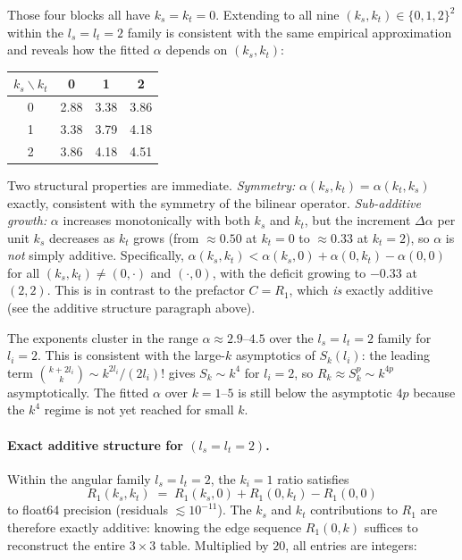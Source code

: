 \documentclass{article}
\begin{document}
Those four blocks all have $k_s=k_t=0$.
Extending to all nine $(k_s,k_t)\in\{0,1,2\}^2$ within the $l_s=l_t=2$ family
is consistent with the same empirical approximation and reveals how the fitted $\alpha$ depends on $(k_s,k_t)$:

\begin{center}
\begin{tabular}{c|ccc}
  $k_s \backslash k_t$ & 0 & 1 & 2 \\
  \hline
  0 & 2.88 & 3.38 & 3.86 \\
  1 & 3.38 & 3.79 & 4.18 \\
  2 & 3.86 & 4.18 & 4.51 \\
\end{tabular}
\end{center}

Two structural properties are immediate.
\emph{Symmetry:} $\alpha(k_s,k_t) = \alpha(k_t,k_s)$ exactly, consistent with
the symmetry of the bilinear operator.
\emph{Sub-additive growth:} $\alpha$ increases monotonically with both $k_s$ and
$k_t$, but the increment $\Delta\alpha$ per unit $k_s$ decreases as $k_t$ grows
(from $\approx 0.50$ at $k_t=0$ to $\approx 0.33$ at $k_t=2$), so $\alpha$ is
\emph{not} simply additive.  Specifically, $\alpha(k_s,k_t) < \alpha(k_s,0) +
\alpha(0,k_t) - \alpha(0,0)$ for all $(k_s,k_t)\neq(0,\cdot)$ and $(\cdot,0)$,
with the deficit growing to $-0.33$ at $(2,2)$.
This is in contrast to the prefactor $C = R_1$, which \emph{is} exactly additive
(see the additive structure paragraph above).

The exponents cluster in the range $\alpha \approx 2.9$--$4.5$ over the
$l_s=l_t=2$ family for $l_i=2$.
This is consistent with the large-$k$ asymptotics of $S_k(l_i)$:
the leading term $\binom{k+2l_i}{k} \sim k^{2l_i}/(2l_i)!$ gives
$S_k \sim k^4$ for $l_i=2$, so $R_k \approx S_k^p \sim k^{4p}$ asymptotically.
The fitted $\alpha$ over $k=1$--$5$ is still below the asymptotic $4p$ because
the $k^4$ regime is not yet reached for small $k$.

\paragraph{Exact additive structure for $(l_s=l_t=2)$.}
Within the angular family $l_s=l_t=2$, the $k_i=1$ ratio satisfies
\[
  R_1(k_s,k_t) \;=\; R_1(k_s,0) + R_1(0,k_t) - R_1(0,0)
\]
to float64 precision (residuals $\lesssim 10^{-11}$).
The $k_s$ and $k_t$ contributions to $R_1$ are therefore exactly additive:
knowing the edge sequence $R_1(0,k)$ suffices to reconstruct the entire
$3\times 3$ table.  Multiplied by $20$, all entries are integers:
\end{document}
